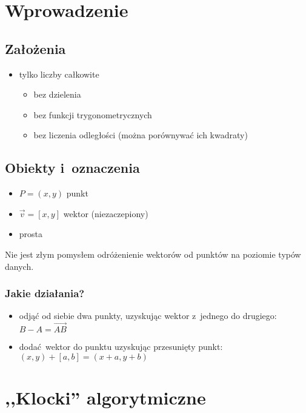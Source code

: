 \section*{Wprowadzenie}
\subsection*{Założenia}
\begin{itemize}
    \item tylko liczby całkowite
        \begin{itemize}[label={\(\implies\)}]
            \item bez dzielenia
            \item bez funkcji trygonometrycznych
            \item bez liczenia odległości (można porównywać ich kwadraty)
        \end{itemize}
\end{itemize}
\subsection*{Obiekty i~oznaczenia}
\begin{itemize}
    \item \(P = (x, y)\) punkt
    \item \(\vec{v} = [x, y]\) wektor (niezaczepiony)
    \item prosta
\end{itemize}
Nie jest złym pomysłem odróżenienie wektorów od punktów na poziomie typów danych.
\subsubsection*{Jakie działania?}
\begin{itemize}
    \item odjąć od siebie dwa punkty, uzyskując wektor z~jednego do drugiego: \(B - A = \vec{AB}\)
    \item dodać wektor do punktu uzyskując przesunięty punkt: \((x, y) + [a, b] = (x + a, y + b)\)
\end{itemize}
\section*{,,Klocki'' algorytmiczne}
